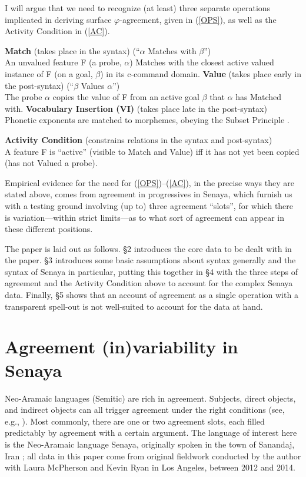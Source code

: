 \documentclass[output=paper
,modfonts
,nonflat]{langsci/langscibook}
\begin{document}
I will argue that we need to recognize (at least) three separate operations implicated in deriving surface $\varphi$-agreement, given in (\ref{OPS}), as well as the Activity Condition in (\ref{AC}).

\eal \label{OPS}
\ex \textbf{Match} {(takes place in the syntax)} \- \hfill (``{$\alpha$} Matches with {$\beta$}'')\\
An unvalued feature F (a probe, {$\alpha$}) Matches with the closest active valued instance of F (on a goal, {$\beta$}) in its c-command domain.
\ex \textbf{Value} (takes place early in the post-syntax) \- \hfill (``{$\beta$} Values {$\alpha$}'')\\
The probe {$\alpha$} copies the value of F from an active goal {$\beta$} that {$\alpha$} has Matched with.
\ex \textbf{Vocabulary Insertion (VI)} (takes place late in the post-syntax)\\
Phonetic exponents are matched to morphemes, obeying the Subset Principle \citep{Halle97}.
\zl

\ea \textbf{Activity Condition} (constrains relations in the syntax and post-syntax)\\A feature F is ``active'' (visible to Match and Value) iff it has not yet been copied (has not Valued a probe).\label{AC}
\z

\noindent Empirical evidence for the need for (\ref{OPS})--(\ref{AC}), in the precise ways they are stated above, comes from agreement in progressives in Senaya, which furnish us with a testing ground involving (up to) three agreement ``slots'', for which there is variation---within strict limits---as to what sort of agreement can appear in these different positions.

The paper is laid out as follows. \S2 introduces the core data to be dealt with in the paper. \S3 introduces some basic assumptions about syntax generally and the syntax of Senaya in particular, putting this together in \S4 with the three steps of agreement and the Activity Condition above to account for the complex Senaya data. Finally, \S5 shows that an account of agreement as a single operation with a transparent spell-out is not well-suited to account for the data at hand.

\section{Agreement (in)variability in Senaya}

Neo-Aramaic languages (Semitic) are rich in agreement. Subjects, direct objects, and indirect objects can all trigger agreement under the right conditions (see, e.g., \citealt{DoronKhan12,KalinvanUrk15}). Most commonly, there are one or two agreement slots, each filled predictably by agreement with a certain argument. The language of interest here is the Neo-Aramaic language Senaya, originally spoken in the town of Sanandaj, Iran \citep{Panoussi90}; all data in this paper come from original fieldwork conducted by the author with Laura McPherson and Kevin Ryan in Los Angeles, between 2012 and 2014.
\end{document}
